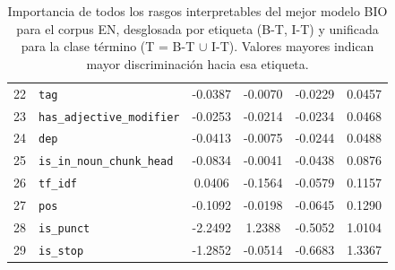 \begin{table}[ht]
\begin{tabular}{@{} r l c c c c @{}}
22 & \texttt{tag} & -0.0387 & -0.0070 & -0.0229 & 0.0457 \\
23 & \texttt{has\_adjective\_modifier} & -0.0253 & -0.0214 & -0.0234 & 0.0468 \\
24 & \texttt{dep} & -0.0413 & -0.0075 & -0.0244 & 0.0488 \\
25 & \texttt{is\_in\_noun\_chunk\_head} & -0.0834 & -0.0041 & -0.0438 & 0.0876 \\
26 & \texttt{tf\_idf} & 0.0406 & -0.1564 & -0.0579 & 0.1157 \\
27 & \texttt{pos} & -0.1092 & -0.0198 & -0.0645 & 0.1290 \\
28 & \texttt{is\_punct} & -2.2492 & 1.2388 & -0.5052 & 1.0104 \\
29 & \texttt{is\_stop} & -1.2852 & -0.0514 & -0.6683 & 1.3367 \\
\bottomrule
\end{tabular}
\caption{Importancia de todos los rasgos interpretables del mejor modelo BIO para el corpus EN, desglosada por etiqueta (B-T, I-T) y unificada para la clase término (T = B-T $\cup$ I-T). Valores mayores indican mayor discriminación hacia esa etiqueta.}
\label{tab:bio_importancia_en}
\normalsize
\end{table}